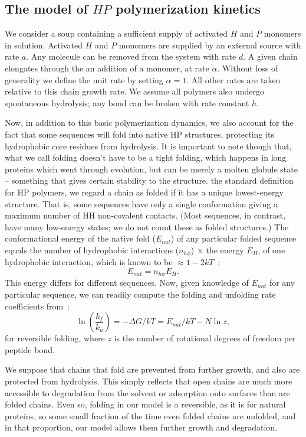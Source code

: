 \documentclass[journal=jacsat,manuscript=article,layout=twocolumn]{achemso}
\newcommand*{\ga}{\alpha}
\newcommand*{\gD}{\Delta}
\newcommand*{\pt}[1]{\left( #1\right)}
\begin{document}
\subsection{The model of $HP$ polymerization kinetics}

 We consider a soup containing a sufficient supply of activated $H$ and $P$ monomers in solution. 
 Activated $H$ and $P$ monomers are supplied by an external source with rate $a$.  Any molecule 
can 
be removed from the system with rate $d$.  A given chain elongates through the 
an addition of a monomer, at rate $\ga$. Without loss of 
generality we define the unit rate by setting $\ga = 1$.  All other rates are taken relative to 
this 
chain growth rate.  We assume all polymers also undergo spontaneous hydrolysis; any bond can be 
broken with rate constant $h$.  

 Now, in addition to this basic polymerization dynamics, we also account for the fact that some 
sequences 
will fold into native HP structures, protecting its hydrophobic core residues from hydrolysis. It 
is important to note though that, what we call folding doesn't have to be a tight folding, which 
happens in long proteins which went through evolution, but can be merely a molten globule state -- 
something that gives certain stability to the structure.
the standard definition for HP polymers, we regard a chain as folded if it has a unique 
lowest-energy structure.  That is, some sequences have only a single conformation giving a maximum 
number of HH non-covalent contacts.  (Most sequences, in contrast, 
have many low-energy states; we do not count these as folded structures.)  
The conformational energy of the native fold ($E_{nat}$) of any particular folded sequence equals 
the number of hydrophobic interactions ($n_{h\phi}$) $\times$ the energy $E_H$, of one hydrophobic 
interaction, which is known to be $\approx 1-2kT$~\cite{Ghosh2009}:
\begin{equation}
 E_{nat}=n_{h\phi}E_H.
\end{equation} 
This energy differs for different sequences.  Now, given knowledge of $E_{nat}$ for any particular 
sequence, we can readily compute the folding and unfolding rate coefficients from~\cite{Ghosh2009}:
\begin{equation}
 \ln\pt{\frac{k_f}{k_u}}=-\gD G/kT = E_{nat}/kT-N\ln z,
\end{equation} 
for reversible folding, where $z$ is the number of rotational degrees of freedom per peptide bond. 
 

We suppose that chains that fold are prevented from further growth, and also are protected from 
hydrolysis.  This simply reflects that open chains are much more accessible to degradation from 
the 
solvent or adsorption onto surfaces than are folded chains.  Even so, folding in our model is a 
reversible, as it is for natural proteins, so some small fraction of the time even 
folded chains are unfolded, and in that proportion, our model allows them further growth and 
degradation.
 
\end{document}
